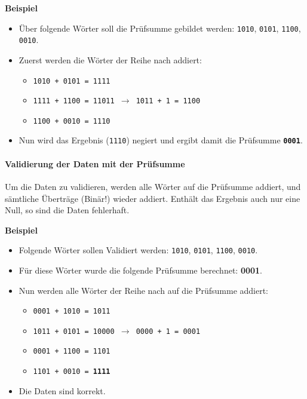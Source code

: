 			\textbf{Beispiel}
			\begin{itemize}
				\item Über folgende Wörter soll die Prüfsumme gebildet werden: \texttt{1010}, \texttt{0101}, \texttt{1100}, \texttt{0010}.
				\item Zuerst werden die Wörter der Reihe nach addiert:
					\begin{itemize}
						\item \texttt{1010 + 0101 = 1111}
						\item \texttt{1111 + 1100 = 11011 \(\rightarrow\) 1011 + 1 = 1100}
						\item \texttt{1100 + 0010 = 1110}
					\end{itemize}
				\item Nun wird das Ergebnis (\texttt{1110}) negiert und ergibt damit die Prüfsumme \textbf{\texttt{0001}}.
			\end{itemize}

		\paragraph{Validierung der Daten mit der Prüfsumme}
			Um die Daten zu validieren, werden alle Wörter auf die Prüfsumme addiert, und sämtliche Überträge (Binär!) wieder addiert. Enthält das Ergebnis auch nur eine Null, so sind die Daten fehlerhaft.

			\textbf{Beispiel}
			\begin{itemize}
				\item Folgende Wörter sollen Validiert werden: \texttt{1010}, \texttt{0101}, \texttt{1100}, \texttt{0010}.
				\item Für diese Wörter wurde die folgende Prüfsumme berechnet: \textbf{0001}.
				\item Nun werden alle Wörter der Reihe nach auf die Prüfsumme addiert:
					\begin{itemize}
						\item \texttt{0001 + 1010 = 1011}
						\item \texttt{1011 + 0101 = 10000 \(\rightarrow\) 0000 + 1 = 0001}
						\item \texttt{0001 + 1100 = 1101}
						\item \texttt{1101 + 0010 = \textbf{1111}}
					\end{itemize}
				\item Die Daten sind korrekt.
			\end{itemize}

